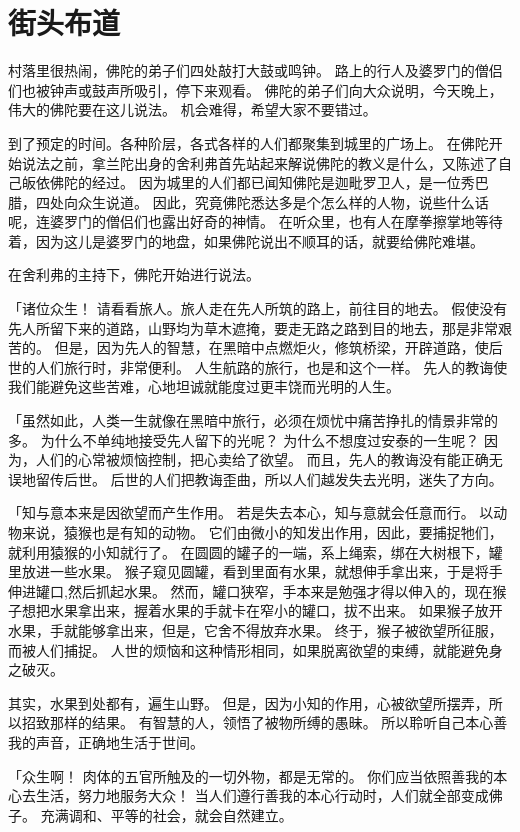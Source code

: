 \documentclass[twoside,openany]{book}
\begin{document}
\section{街头布道}\label{sec6.5}

村落里很热闹，佛陀的弟子们四处敲打大鼓或鸣钟。
路上的行人及婆罗门的僧侣们也被钟声或鼓声所吸引，停下来观看。
佛陀的弟子们向大众说明，今天晚上，伟大的佛陀要在这儿说法。
机会难得，希望大家不要错过。

到了预定的时间。各种阶层，各式各样的人们都聚集到城里的广场上。
在佛陀开始说法之前，拿兰陀出身的舍利弗首先站起来解说佛陀的教义是什么，又陈述了自己皈依佛陀的经过。
因为城里的人们都已闻知佛陀是迦毗罗卫人，是一位秀巴腊，四处向众生说道。
因此，究竟佛陀悉达多是个怎么样的人物，说些什么话呢，连婆罗门的僧侣们也露出好奇的神情。
在听众里，也有人在摩拳擦掌地等待着，因为这儿是婆罗门的地盘，如果佛陀说出不顺耳的话，就要给佛陀难堪。

在舍利弗的主持下，佛陀开始进行说法。

「诸位众生！
请看看旅人。旅人走在先人所筑的路上，前往目的地去。
假使没有先人所留下来的道路，山野均为草木遮掩，要走无路之路到目的地去，那是非常艰苦的。
但是，因为先人的智慧，在黑暗中点燃炬火，修筑桥梁，开辟道路，使后世的人们旅行时，非常便利。
人生航路的旅行，也是和这个一样。
先人的教诲使我们能避免这些苦难，心地坦诚就能度过更丰饶而光明的人生。

「虽然如此，人类一生就像在黑暗中旅行，必须在烦忧中痛苦挣扎的情景非常的多。
为什么不单纯地接受先人留下的光呢？
为什么不想度过安泰的一生呢？
因为，人们的心常被烦恼控制，把心卖给了欲望。
而且，先人的教诲没有能正确无误地留传后世。
后世的人们把教诲歪曲，所以人们越发失去光明，迷失了方向。

「知与意本来是因欲望而产生作用。
若是失去本心，知与意就会任意而行。
以动物来说，猿猴也是有知的动物。
它们由微小的知发出作用，因此，要捕捉牠们，就利用猿猴的小知就行了。
在圆圆的罐子的一端，系上绳索，绑在大树根下，罐里放进一些水果。
猴子窥见圆罐，看到里面有水果，就想伸手拿出来，于是将手伸进罐口,然后抓起水果。
然而，罐口狭窄，手本来是勉强才得以伸入的，现在猴子想把水果拿出来，握着水果的手就卡在窄小的罐口，拔不出来。
如果猴子放开水果，手就能够拿出来，但是，它舍不得放弃水果。
终于，猴子被欲望所征服，而被人们捕捉。
人世的烦恼和这种情形相同，如果脱离欲望的束缚，就能避免身之破灭。

其实，水果到处都有，遍生山野。
但是，因为小知的作用，心被欲望所摆弄，所以招致那样的结果。
有智慧的人，领悟了被物所缚的愚昧。
所以聆听自己本心善我的声音，正确地生活于世间。

「众生啊！
肉体的五官所触及的一切外物，都是无常的。
你们应当依照善我的本心去生活，努力地服务大众！
当人们遵行善我的本心行动时，人们就全部变成佛子。
充满调和、平等的社会，就会自然建立。
\end{document}
